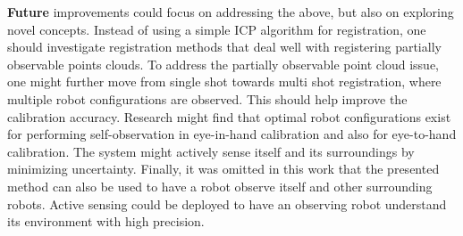 \textbf{Future} improvements could focus on addressing the above, but also on exploring novel concepts. Instead of using a simple ICP algorithm for registration, one should investigate registration methods that deal well with registering partially observable points clouds. To address the partially observable point cloud issue, one might further move from single shot towards multi shot registration, where multiple robot configurations are observed. This should help improve the calibration accuracy. Research might find that optimal robot configurations exist for performing self-observation in eye-in-hand calibration and also for eye-to-hand calibration. The system might actively sense itself and its surroundings by minimizing uncertainty. Finally, it was omitted in this work that the presented method can also be used to have a robot observe itself and other surrounding robots. Active sensing could be deployed to have an observing robot understand its environment with high precision.
